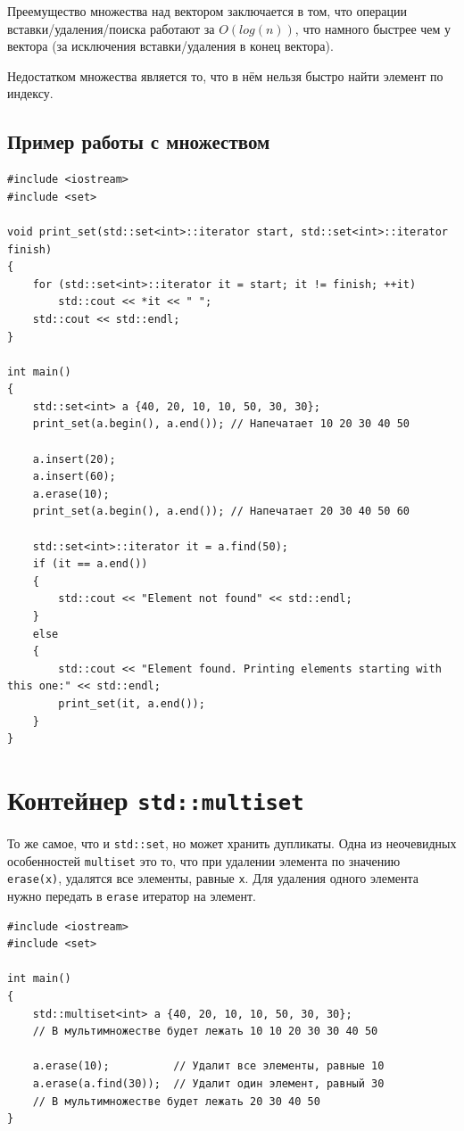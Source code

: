\documentclass{article}
\begin{document}
Преемущество множества над вектором заключается в том, что операции вставки/удаления/поиска работают за $O(log(n))$, что намного быстрее чем у вектора (за исключения вставки/удаления в конец вектора).

Недостатком множества является то, что в нём нельзя быстро найти элемент по индексу.




\newpage
\subsection*{Пример работы с множеством}

\begin{lstlisting}
#include <iostream>
#include <set>

void print_set(std::set<int>::iterator start, std::set<int>::iterator finish)
{
    for (std::set<int>::iterator it = start; it != finish; ++it)
        std::cout << *it << " ";
    std::cout << std::endl;
}

int main()
{
    std::set<int> a {40, 20, 10, 10, 50, 30, 30}; 
    print_set(a.begin(), a.end()); // Напечатает 10 20 30 40 50
    
    a.insert(20);
    a.insert(60);
    a.erase(10);
    print_set(a.begin(), a.end()); // Напечатает 20 30 40 50 60
    
    std::set<int>::iterator it = a.find(50);
    if (it == a.end())
    {
        std::cout << "Element not found" << std::endl;
    }
    else
    {
        std::cout << "Element found. Printing elements starting with this one:" << std::endl;
        print_set(it, a.end());
    }
}
\end{lstlisting}


\section*{Контейнер \texttt{std::multiset}}
То же самое, что и \texttt{std::set}, но может хранить дупликаты. Одна из неочевидных особенностей \texttt{multiset} это то, что при удалении элемента по значению \texttt{erase(x)}, удалятся все элементы, равные \texttt{x}. Для удаления одного элемента нужно передать в \texttt{erase} итератор на элемент.

\begin{lstlisting}
#include <iostream>
#include <set>

int main()
{
    std::multiset<int> a {40, 20, 10, 10, 50, 30, 30};  
    // В мультимножестве будет лежать 10 10 20 30 30 40 50
    
    a.erase(10);          // Удалит все элементы, равные 10
    a.erase(a.find(30));  // Удалит один элемент, равный 30
    // В мультимножестве будет лежать 20 30 40 50
}
\end{lstlisting}
\end{document}
